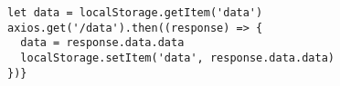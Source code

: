 \begin{minipage}{0.95\linewidth}
    \begin{lstlisting}[caption={Code snippet of a push notification implementation \cite{CacheExample}.},
    label={cachecode}]
let data = localStorage.getItem('data')
axios.get('/data').then((response) => {
  data = response.data.data
  localStorage.setItem('data', response.data.data)
})}
\end{lstlisting}
\end{minipage}